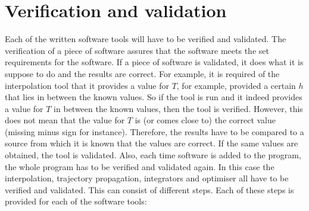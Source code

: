 \section{Verification and validation}
\label{sec:vandv}
Each of the written software tools will have to be verified and validated. The verification of a piece of software assures that the software meets the set requirements for the software. If a piece of software is validated, it does what it is suppose to do and the results are correct. For example, it is required of the interpolation tool that it provides a value for $T$, for example, provided a certain $h$ that lies in between the known values. So if the tool is run and it indeed provides a value for $T$ in between the known values, then the tool is verified. However, this does not mean that the value for $T$ is (or comes close to) the correct value (missing minus sign for instance). Therefore, the results have to be compared to a source from which it is known that the values are correct. If the same values are obtained, the tool is validated. Also, each time software is added to the program, the whole program has to be verified and validated again. In this case the interpolation, trajectory propagation, integrators and optimiser all have to be verified and validated. This can consist of different steps. Each of these steps is provided for each of the software tools:

